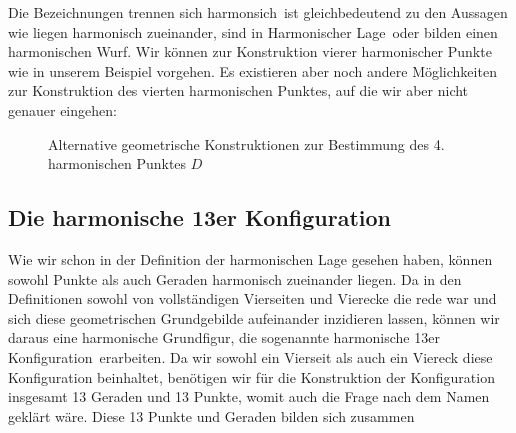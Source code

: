 \documentclass[12pt,a4paper]{article}
\begin{document}
Die Bezeichnungen \glqq trennen sich harmonsich\grqq ~ist gleichbedeutend zu den Aussagen wie \glqq liegen harmonisch zueinander\grqq , \glqq sind in Harmonischer Lage\grqq ~oder \glqq bilden einen harmonischen Wurf\grqq \citep[vgl.][S. 46]{projektiveGeometrie}.
\newline
\newline
Wir können zur Konstruktion vierer harmonischer Punkte wie in unserem Beispiel vorgehen. Es existieren aber noch andere Möglichkeiten zur Konstruktion des vierten harmonischen Punktes, auf die wir aber nicht genauer eingehen:

\begin{figure} [htbp]
 \hfill
{}
\caption{Alternative geometrische Konstruktionen zur Bestimmung des 4. harmonischen Punktes $D$}
\end{figure} 

\newpage
\subsection{Die harmonische 13er Konfiguration}
\label{subsec:harmonischeKonfiguration}

Wie wir schon in der Definition der harmonischen Lage gesehen haben, können sowohl Punkte als auch Geraden harmonisch zueinander liegen. Da in den Definitionen sowohl von vollständigen Vierseiten und Vierecke die rede war und sich diese geometrischen Grundgebilde aufeinander inzidieren lassen, können wir daraus eine harmonische Grundfigur, die sogenannte \glqq harmonische 13er Konfiguration\grqq ~erarbeiten. Da wir sowohl ein Vierseit als auch ein Viereck diese Konfiguration beinhaltet, benötigen wir für die Konstruktion der Konfiguration insgesamt 13 Geraden und 13 Punkte, womit auch die Frage nach dem Namen geklärt wäre. Diese 13 Punkte und Geraden bilden sich zusammen
\end{document}
